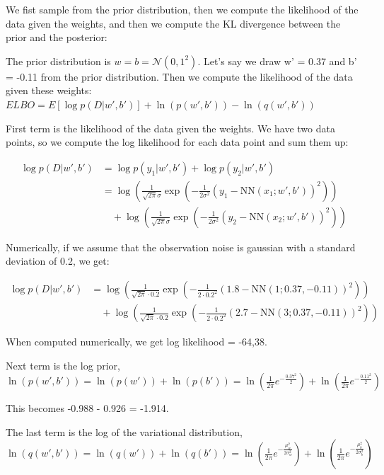 We fist sample from the prior distribution, then we compute the likelihood of the data given the weights, and then we compute the KL divergence between the prior and the posterior:

The prior distribution is $w =b = \mathcal{N}(0,1^2)$.
Let's say we draw w' = 0.37 and b' = -0.11 from the prior distribution. Then we compute the likelihood of the data given these weights:
\\

$ELBO = E[\log p(D|w',b')] + \ln(p(w',b')) - \ln(q(w',b'))$

First term is the likelihood of the data given the weights. We have two data points, so we compute the log likelihood for each data point and sum them up:

\begin{align}
  \log p(D|w',b') & = \log p(y_1|w',b') + \log p(y_2|w',b')                                                                                   \\
                  & = \log \left(\frac{1}{\sqrt{2\pi}\sigma} \exp\left(-\frac{1}{2\sigma^2}(y_1 - \text{NN}(x_1;w',b'))^2\right)\right)       \\
                  & \quad + \log \left(\frac{1}{\sqrt{2\pi}\sigma} \exp\left(-\frac{1}{2\sigma^2}(y_2 - \text{NN}(x_2;w',b'))^2\right)\right)
\end{align}

Numerically, if we assume that the observation noise is gaussian with a standard deviation of 0.2, we get:

\begin{align}
  \log p(D|w',b') & = \log \left(\frac{1}{\sqrt{2\pi} \cdot 0.2} \exp\left(-\frac{1}{2 \cdot 0.2^2}(1.8 - \text{NN}(1;0.37,-0.11))^2\right)\right)       \\
                  & \quad + \log \left(\frac{1}{\sqrt{2\pi} \cdot 0.2} \exp\left(-\frac{1}{2 \cdot 0.2^2}(2.7 - \text{NN}(3;0.37,-0.11))^2\right)\right)
\end{align}

When computed numerically, we get log likelihood = -64,38.

Next term is the log prior, $\ln(p(w',b')) = \ln(p(w')) + \ln(p(b')) = \ln\left(\frac{1}{2\pi} e^{-\frac{0.37^2}{2}}\right) + \ln\left(\frac{1}{2\pi} e^{-\frac{0.11^2}{2}}\right)$

This becomes -0.988 - 0.926 = -1.914.

The last term is the log of the variational distribution, $\ln(q(w',b')) = \ln(q(w')) + \ln(q(b')) = \ln\left(\frac{1}{2\pi} e^{-\frac{\mu_w^2}{2\sigma_w^2}}\right) + \ln\left(\frac{1}{2\pi} e^{-\frac{\mu_b^2}{2\sigma_b^2}}\right)$




